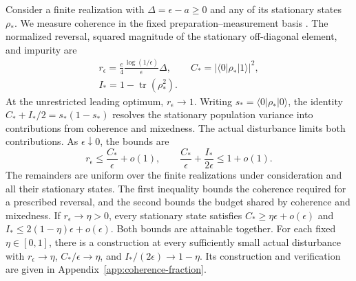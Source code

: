 \documentclass[aps,pra,reprint,amsmath,amssymb,nofootinbib,floatfix,longbibliography]{revtex4-2}
\theoremstyle{aps}
\DeclareMathOperator{\tr}{tr}
\newcommand{\eps}{\epsilon}
\newcommand{\ket}[1]{|#1\rangle}
\newcommand{\bra}[1]{\langle#1|}
\begin{document}
Consider a finite realization with $\Delta=\eps-a\ge0$ and any of its stationary states $\rho_*$. We measure coherence in the fixed preparation--measurement basis \cite{Baumgratz2014}. The normalized reversal, squared magnitude of the stationary off-diagonal element, and impurity are
\begin{equation}\label{eq:resource-definitions}
 \begin{gathered}
 r_\eps=\frac e4\frac{\log(1/\eps)}\eps\Delta,\qquad
 C_*=|\bra0\rho_*\ket1|^2,\\
 I_*=1-\tr(\rho_*^2).
 \end{gathered}
\end{equation}
At the unrestricted leading optimum, $r_\eps\to1$. Writing $s_*=\bra0\rho_*\ket0$, the identity $C_*+I_*/2=s_*(1-s_*)$ resolves the stationary population variance into contributions from coherence and mixedness. The actual disturbance limits both contributions. As $\eps\downarrow0$, the bounds are
\begin{equation}\label{eq:coherence-fraction}
 r_\eps\le\frac{C_*}{\eps}+o(1),\qquad
 \frac{C_*}{\eps}+\frac{I_*}{2\eps}\le1+o(1).
\end{equation}
The remainders are uniform over the finite realizations under consideration and all their stationary states. The first inequality bounds the coherence required for a prescribed reversal, and the second bounds the budget shared by coherence and mixedness. If $r_\eps\to\eta>0$, every stationary state satisfies $C_*\ge\eta\eps+o(\eps)$ and $I_*\le2(1-\eta)\eps+o(\eps)$. Both bounds are attainable together. For each fixed $\eta\in[0,1]$, there is a construction at every sufficiently small actual disturbance with $r_\eps\to\eta$, $C_*/\eps\to\eta$, and $I_*/(2\eps)\to1-\eta$. Its construction and verification are given in Appendix~\ref{app:coherence-fraction}.
\end{document}
